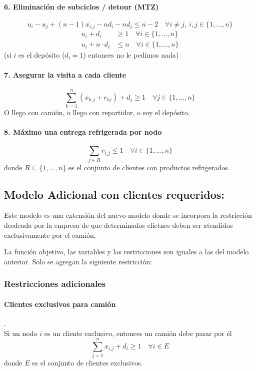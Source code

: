 \documentclass{article}
\begin{document}
    \paragraph{6. Eliminación de subciclos / detour (MTZ)}
    \[
    u_i - u_j + (n - 1) x_{i\_j} - n d_i - n d_j \leq n - 2 \quad \forall i \ne j,\ i,j \in \{1, \dots, n\}
    \]
    \begin{align*}
    u_i + d_i &\geq 1 \quad \forall i \in \{1, \dots, n\} \\
    u_i + n \cdot d_i &\leq n \quad \forall i \in \{1, \dots, n\}
    \end{align*}
    (si $i$ es el depósito ($d_i=1$) entonces no le pedimos nada)

    \paragraph{7. Asegurar la visita a cada cliente}
    \[
    \sum_{k=1}^{n} (x_{k\_j} + r_{kj}) + d_j \geq 1 \quad \forall j \in \{1, \dots, n\}
    \]
    O llego con camión, o llego con repartidor, o soy el depósito.

    \paragraph{8. Máximo una entrega refrigerada por nodo}
    \[
    \sum_{j \in R} r_{i\_j} \leq 1 \quad \forall i \in \{1, \dots, n\}
    \]
    donde \( R \subseteq \{1, \dots, n\} \) es el conjunto de clientes con productos refrigerados.




    \subsection{Modelo Adicional con clientes requeridos:} \label{modelo1}

    Este modelo es una extensión del nuevo modelo donde se incorpora la restricción desdeada por la empresa de que determinados clietnes deben ser atendidos exclusivamente por el camión.

    La función objetivo, las variables y las restricciones son iguales a las del modelo anterior. Solo se agregan la siguiente restricción:
    \subsubsection*{Restricciones adicionales}

    \paragraph{Clientes exclusivos para camión} . \\
    Si un nodo $i$ es un cliente exclusivo, entonces un camión debe pasar por él
    \[
    \sum_{j=1}^{n} x_{i\_j} + d_{i} \geq 1 \quad \forall i \in E
    \]
    donde $E$ es el conjunto de clientes exclusivos.
\end{document}
